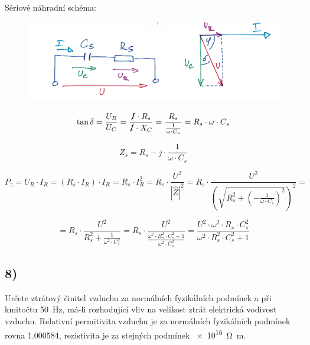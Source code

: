 
Sériové náhradní schéma:
\begin{figure}[h]
    \centering
    \includegraphics[width=.7\textwidth]{images/ul7_sch.jpg}
\end{figure}

\begin{equation*}
    \tan \delta = \frac{U_R}{U_C} = \frac{\cancel{I} \cdot R_s}{\cancel{I} \cdot X_C} = \frac{R_s}{\frac{1}{\omega \cdot C_s}} = R_s \cdot \omega \cdot C_s 
\end{equation*}

\begin{equation*}
    Z_s = R_s - j \cdot \frac{1}{\omega \cdot C_s}
\end{equation*}

\begin{equation*}
    P_z = U_R \cdot I_R = (R_s \cdot I_R) \cdot I_R = R_s \cdot I_R^2 = R_s \cdot \frac{U^2}{\left| \widehat{Z} \right|^2} = R_s \cdot \frac{U^2}{\left( \sqrt{R_s^2 + \left( - \frac{1}{\omega \cdot C_s} \right)^2} \right)^2} = 
\end{equation*}

\begin{equation*}
    = R_s \cdot \frac{U^2}{R_s^2 + \frac{1}{\omega^2 \cdot C_s^2}} = R_s \cdot \frac{U^2}{\frac{\omega^2 \cdot R_s^2 \cdot C_s^2 + 1}{\omega^2 \cdot C_s^2}} = \frac{U^2 \cdot \omega^2 \cdot R_s \cdot C_s^2}{\omega^2 \cdot R_s^2 \cdot C_s^2 + 1}
\end{equation*}

\newpage


\subsection*{8)}
Určete ztrátový činitel vzduchu za normálních fyzikálních podmínek a při kmitočtu \SI{50}{\hertz}, má-li rozhodující vliv na velikost ztrát elektrická vodivost vzduchu. Relativní permitivita vzduchu je za normálních fyzikálních podmínek rovna \SI{1,000584}{}, rezistivita je za stejných podmínek \SI{e16}{\ohm\meter}.

